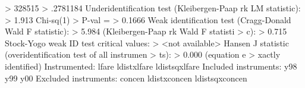 > 328515                                                    
>           .2781184
Underidentification test (Kleibergen-Paap rk LM statistic): 
>              1.913
                                                   Chi-sq(1)
>  P-val =                                                  
>             0.1666
Weak identification test (Cragg-Donald Wald F statistic):   
>              5.984
                         (Kleibergen-Paap rk Wald F statisti
> c):                                                       
>              0.715
Stock-Yogo weak ID test critical values:                    
>    <not available>
Hansen J statistic (overidentification test of all instrumen
> ts):                                                      
>              0.000
                                                 (equation e
> xactly identified)
Instrumented:         lfare ldistxlfare ldistsqxlfare
Included instruments: y98 y99 y00
Excluded instruments: concen ldistxconcen ldistsqxconcen
{\smallskip}
